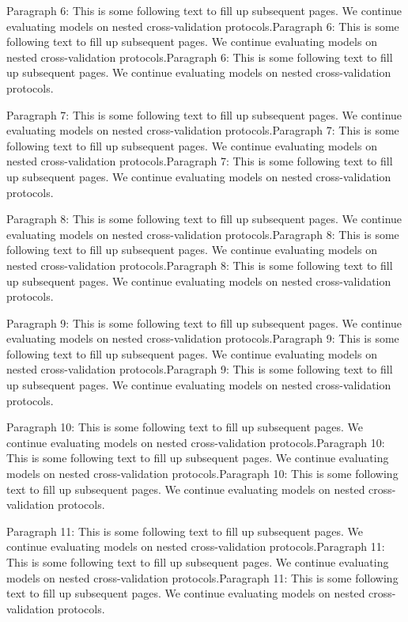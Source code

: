 \documentclass{IEEEtran}
\begin{document}
Paragraph 6: This is some following text to fill up subsequent pages. We continue evaluating models on nested cross-validation protocols.Paragraph 6: This is some following text to fill up subsequent pages. We continue evaluating models on nested cross-validation protocols.Paragraph 6: This is some following text to fill up subsequent pages. We continue evaluating models on nested cross-validation protocols.

Paragraph 7: This is some following text to fill up subsequent pages. We continue evaluating models on nested cross-validation protocols.Paragraph 7: This is some following text to fill up subsequent pages. We continue evaluating models on nested cross-validation protocols.Paragraph 7: This is some following text to fill up subsequent pages. We continue evaluating models on nested cross-validation protocols.

Paragraph 8: This is some following text to fill up subsequent pages. We continue evaluating models on nested cross-validation protocols.Paragraph 8: This is some following text to fill up subsequent pages. We continue evaluating models on nested cross-validation protocols.Paragraph 8: This is some following text to fill up subsequent pages. We continue evaluating models on nested cross-validation protocols.

Paragraph 9: This is some following text to fill up subsequent pages. We continue evaluating models on nested cross-validation protocols.Paragraph 9: This is some following text to fill up subsequent pages. We continue evaluating models on nested cross-validation protocols.Paragraph 9: This is some following text to fill up subsequent pages. We continue evaluating models on nested cross-validation protocols.

Paragraph 10: This is some following text to fill up subsequent pages. We continue evaluating models on nested cross-validation protocols.Paragraph 10: This is some following text to fill up subsequent pages. We continue evaluating models on nested cross-validation protocols.Paragraph 10: This is some following text to fill up subsequent pages. We continue evaluating models on nested cross-validation protocols.

Paragraph 11: This is some following text to fill up subsequent pages. We continue evaluating models on nested cross-validation protocols.Paragraph 11: This is some following text to fill up subsequent pages. We continue evaluating models on nested cross-validation protocols.Paragraph 11: This is some following text to fill up subsequent pages. We continue evaluating models on nested cross-validation protocols.
\end{document}
